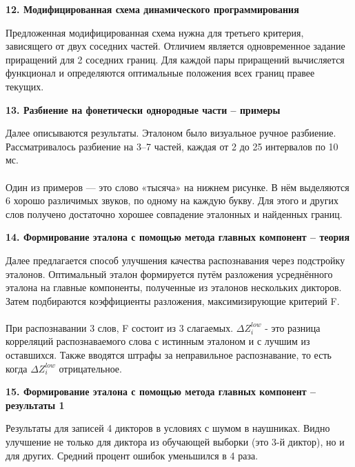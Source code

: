 \documentclass[a4paper, 12pt]{article}
\begin{document}
	
	
	\begin{center}
		\textbf{\large 12. Модифицированная схема динамического программирования}
	\end{center}	
	\noindent
	Предложенная модифицированная схема нужна для третьего критерия, зависящего от двух соседних частей. Отличием является одновременное задание приращений для 2 соседних границ. Для каждой пары приращений вычисляется функционал и определяются оптимальные положения всех границ правее текущих.
	
	
	
	\begin{center}
		\textbf{\large 13. Разбиение на фонетически однородные части – примеры}
	\end{center}	
	\noindent
	Далее описываются результаты. Эталоном было визуальное ручное разбиение. Рассматривалось разбиение на 3–7 частей, каждая от 2 до 25 интервалов по 10 мс.
	\\\\
	Один из примеров — это слово «тысяча» на нижнем рисунке. В нём выделяются 6 хорошо различимых звуков, по одному на каждую букву. Для этого и других слов получено достаточно хорошее совпадение эталонных и найденных границ.
	
	
	
	\begin{center}
		\textbf{\large 14. Формирование эталона с помощью метода главных компонент – теория}
	\end{center}	
	\noindent
	Далее предлагается способ улучшения качества распознавания через подстройку эталонов. Оптимальный эталон формируется путём разложения усреднённого эталона на главные компоненты, полученные из эталонов нескольких дикторов. Затем подбираются коэффициенты разложения, максимизирующие критерий F.
	\\\\
	При распознавании 3 слов, F состоит из 3 слагаемых. $\Delta Z_i^{low}$ - это разница корреляций распознаваемого слова с истинным эталоном и с лучшим из оставшихся. Также вводятся штрафы за неправильное распознавание, то есть когда $\Delta Z_i^{low}$ отрицательное.
	
	
	
	\begin{center}
		\textbf{\large 15. Формирование эталона с помощью метода главных компонент – результаты 1}
	\end{center}	
	\noindent
	Результаты для записей 4 дикторов в условиях с шумом в наушниках. Видно улучшение не только для диктора из обучающей выборки (это 3-й диктор), но и для других. Средний процент ошибок уменьшился в 4 раза.
	
\end{document}
